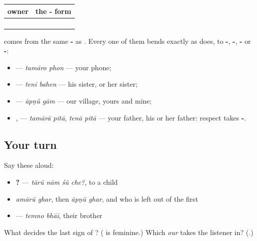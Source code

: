 \begin{grammarlens}[title={Grammar Lens: more than one owner}]
\noindent
\begin{tabularx}{\linewidth}{@{}>{\raggedright\arraybackslash}X>{\raggedright\arraybackslash}X@{}}
\toprule
\textbf{owner} & \textbf{the -\gu{ું} form} \\
\midrule
\gu{અમે} & \gu{અમારું} \\
\gu{આપણે} & \gu{આપણું} \\
\gu{તમે} & \gu{તમારું} \\
\gu{તેઓ} & \gu{તેમનું} \\
\bottomrule
\end{tabularx}

\textbf{} comes from the same \textbf{-} as \textbf{}. Every one of them bends exactly as \textbf{} does, to \textbf{-}, \textbf{-}, \textbf{-} or \textbf{-}:

\begin{itemize}
\raggedright
  \item \textbf{ } — \emph{tamāro phon} — your phone;
  \item \textbf{ } — \emph{tenī bahen} — his sister, or her sister;
  \item \textbf{ } — \emph{āpṇũ gām} — our village, yours and mine;
  \item \textbf{ }, \textbf{ } — \emph{tamārā pitā}, \emph{tenā pitā} — your father, his or her father: respect takes \textbf{-}.
\end{itemize}
\end{grammarlens}

\subsection*{Your turn}
Say these aloud:

\begin{itemize}
\raggedright
  \item \textbf{   ?} — \emph{tārũ nām śũ che?}, to a child
  \item \emph{amārũ ghar}, then \emph{āpṇũ ghar}, and who is left out of the first
  \item \textbf{ } — \emph{temno bhāī}, their brother
\end{itemize}

\begin{tcolorbox}[breakable,colback=teal!4,colframe=teal!35!black,title={Before you move on}]
What decides the last sign of \textbf{ }? (\textbf{} is feminine.) Which \emph{our} takes the listener in? (\textbf{}.)
\end{tcolorbox}
